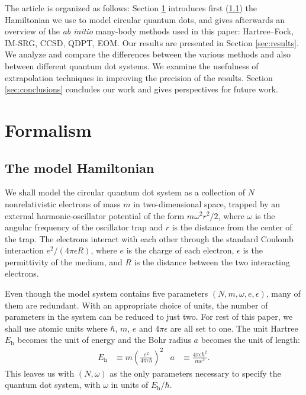 The article is organized as follows: Section \ref{sec:formalism}
introduces first (\ref{subsec:modelHamiltonian}) the Hamiltonian we
use to model circular quantum dots, and gives afterwards an overview
of the \textit{ab initio} many-body methods used in this paper:
Hartree--Fock, IM-SRG, CCSD, QDPT, EOM.  Our results are presented in
Section \ref{sec:results}.  We analyze and compare the differences
between the various methods and also between different quantum dot
systems.  We examine the usefulness of extrapolation techniques in
improving the precision of the results.  Section \ref{sec:conclusions}
concludes our work and gives perspectives for future work.

\section{Formalism}
\label{sec:formalism}

\subsection{The model Hamiltonian}
\label{subsec:modelHamiltonian}

We shall model the circular quantum dot system as a collection of $N$
nonrelativistic electrons of mass $m$ in two-dimensional space, trapped
by an external harmonic-oscillator potential of the form $m \omega^2r^2 / 2$, 
where $\omega$ is the angular frequency of the oscillator
trap and $r$ is the distance from the center of the trap.  The
electrons interact with each other through the standard Coulomb
interaction $e^2 / (4 \pi \epsilon R)$, where $e$ is the charge of
each electron, $\epsilon$ is the permittivity of the medium, and $R$
is the distance between the two interacting electrons.

Even though the model system contains five  parameters $(N, m, \omega,
e, \epsilon)$, many of them are redundant.  With an appropriate choice
of units, the number of parameters in the system can be reduced to
just two.  For rest of this paper, we shall use atomic
units
where $\hbar$, $m$, $e$ and $4 \pi \epsilon$ are all set to
one.  The unit Hartree $E_{\mathrm{h}}$ becomes the unit of energy and the Bohr
radius $a$ becomes the unit of length:
\begin{align*}
  E_{\mathrm{h}} &\equiv m \left(\frac{e^2}{4 \pi \epsilon \hbar}\right)^2 &
  a &\equiv \frac{4 \pi \epsilon \hbar^2}{m e^2}.
\end{align*}
This leaves us with $(N, \omega)$ as the only parameters necessary to
specify the quantum dot system, with $\omega$ in units of
$E_{\mathrm{h}} / \hbar$.


